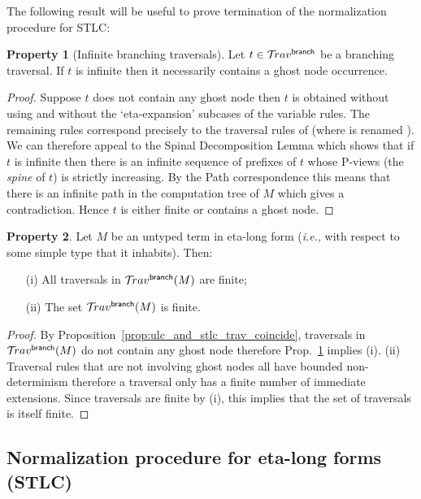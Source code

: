 \documentclass{article}
\makeatletter
\theoremstyle{definition}
\newtheorem{property}{Property}[section]
\newcommand{\ghostlmd}{{\lambda\!\!\lambda}}
\newcommand{\branching}{{\sf branch}}
\newcommand{\travsetbr}{{\travset^\branching}}
\renewcommand\ie{{\it i.e.\@\xspace}}
\makeatother
\begin{document}
The following result will be useful to prove termination of the normalization procedure for STLC:
\begin{property}[Infinite branching traversals]
\label{prop:branching_spine_property}
Let $t\in \travsetbr$ be a branching traversal. If $t$ is infinite then it necessarily contains a ghost node occurrence.
\end{property}
\begin{proof}
Suppose $t$ does not contain any ghost node then
$t$ is obtained without using \rulenamet{Lam^\ghostlmd_\branching} and without the `eta-expansion' subcases of the variable rules. The remaining rules correspond precisely to the traversal rules of
\cite{Ong2006} (where  is renamed ).
We can therefore appeal to the Spinal Decomposition Lemma
\cite[Lemma 14]{Ong2006} which shows that if $t$ is infinite then there is an infinite sequence of prefixes of $t$ whose P-views (the \emph{spine} of $t$) is strictly increasing. By the Path correspondence this means that there is an infinite path in the computation tree of $M$ which gives a contradiction. Hence $t$ is either finite or contains a ghost node.
\end{proof}

\begin{property}
\label{prop:etalong_trav_finite}
Let $M$ be an untyped term in eta-long form (\ie, with respect to some simple type that it inhabits).
Then:
\begin{enumerate}
\item[(i)] All traversals in $\travsetbr(M)$ are finite;
\item[(ii)] The set $\travsetbr(M)$ is finite.
\end{enumerate}
\end{property}
\begin{proof}
By Proposition~\ref{prop:ulc_and_stlc_trav_coincide}, traversals in $\travsetbr(M)$ do not contain any ghost node therefore Prop.~\ref{prop:branching_spine_property} implies (i).
(ii) Traversal rules that are not involving ghost nodes all have bounded non-determinism therefore a traversal only has a finite number of immediate extensions. Since traversals are finite by (i), this implies that the set of traversals is itself finite.
\end{proof}


\subsection{Normalization procedure for eta-long forms (STLC)}
\end{document}
